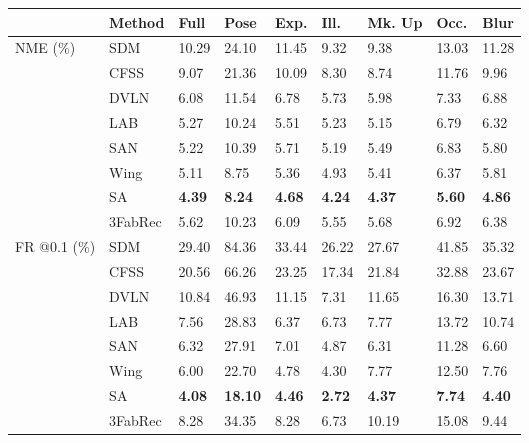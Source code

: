 \documentclass[10pt,twocolumn,letterpaper]{article}
\begin{document}
\begin{table}
	\footnotesize
	\begin{center}
		\begin{tabular}{p{0.5cm}| p{1.55cm}| p{0.34cm} p{0.34cm}p{0.34cm}p{0.34cm}p{0.34cm}p{0.34cm}p{0.40cm}}
			\toprule
			\bf         & \bfseries  Method & \bf  Full  & \bf Pose & \bf Exp. & \bf Ill. & \bf Mk. Up & \bf Occ. & \bf Blur \\
			\toprule
			\multirow{4}{0.5cm}{NME (\%) }    
& SDM \cite{xiong2013supervised} & 10.29 & 24.10 & 11.45 & 9.32 & 9.38 & 13.03 & 11.28 \\
			& CFSS \cite{Zhu2015} &  9.07 & 21.36 & 10.09 & 8.30 & 8.74 & 11.76 & 9.96 \\
			& DVLN \cite{Wu2015} &  6.08 & 11.54 & 6.78  & 5.73 & 5.98 & 7.33 & 6.88 \\
			& LAB \cite{Wu2018} & 5.27 & 10.24 & 5.51 & 5.23 & 5.15 & 6.79 & 6.32  \\
			& SAN \cite{Dong2018} & 5.22 & 10.39 & 5.71 & 5.19 & 5.49 & 6.83 & 5.80  \\
			& Wing \cite{Wu2018}  & 5.11 & 8.75 & 5.36 & 4.93 & 5.41 & 6.37 & 5.81  \\
			& SA \cite{Qian2019}  & \bf 4.39 & \bf 8.24 & \bf 4.68 & \bf 4.24 & \bf 4.37 & \bf 5.60 & \bf 4.86  \\
			\cmidrule{2-9}
			& 3FabRec             & 5.62 & 10.23 &6.09  &5.55 & 5.68 & 6.92 & 6.38  \\
			\cmidrule{2-9}
\toprule
			\multirow{4}{0.5cm}{FR @0.1 (\%)}    
& SDM \cite{xiong2013supervised} & 29.40 & 84.36 & 33.44 & 26.22 & 27.67&  41.85 & 35.32\\
			& CFSS \cite{Zhu2015} & 20.56 & 66.26 & 23.25 & 17.34 & 21.84 & 32.88 & 23.67 \\  
			& DVLN \cite{Wu2015}  & 10.84 & 46.93 & 11.15 & 7.31 & 11.65 & 16.30 & 13.71  \\
			& LAB \cite{Wu2018}   & 7.56 & 28.83 & 6.37 & 6.73 & 7.77 & 13.72 & 10.74  \\
			& SAN \cite{Dong2018} & 6.32 & 27.91 & 7.01 & 4.87 & 6.31 & 11.28 & 6.60  \\
			& Wing \cite{Wu2018}  & 6.00 & 22.70 & 4.78 & 4.30 & 7.77 & 12.50 & 7.76  \\
			& SA \cite{Qian2019}  & \bf 4.08 & \bf 18.10 & \bf 4.46 & \bf 2.72 & \bf 4.37 & \bf 7.74 & \bf 4.40  \\
			\cmidrule{2-9}
			& 3FabRec             & 8.28 & 34.35 & 8.28 &6.73 &10.19 &15.08 & 9.44  \\
			\toprule

\end{tabular}
\end{center}
\end{table}
\end{document}
